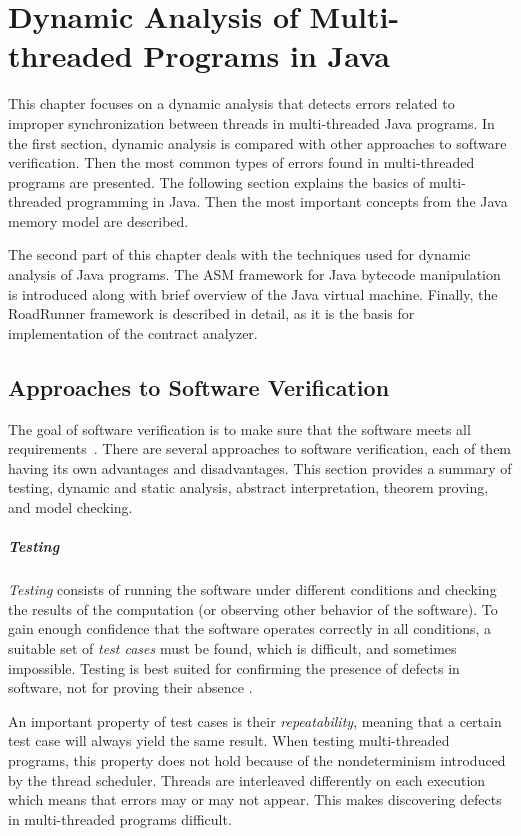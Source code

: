 \chapter{Dynamic Analysis of Multi-threaded Programs in Java}
\label{chTwo}

This chapter focuses on a dynamic analysis that detects errors related to
improper synchronization between threads in multi-threaded Java programs. In the
first section, dynamic analysis is compared with other approaches to software
verification. Then the most common types of errors found in multi-threaded
programs are presented. The following section explains the basics of
multi-threaded programming in Java. Then the most important concepts from the
Java memory model are described.

The second part of this chapter deals with the techniques used for dynamic
analysis of Java programs. The ASM framework for Java bytecode manipulation is
introduced along with brief overview of the Java virtual machine. Finally, the
RoadRunner framework is described in detail, as it is the basis for
implementation of the contract analyzer.


\section{Approaches to Software Verification}
\label{approachesToSwVerification}

The goal of software verification is to make sure that the software meets all
requirements~\cite{fundamentals}. There are several approaches to software
verification, each of them having its own advantages and disadvantages. This
section provides a summary of testing, dynamic and static analysis, abstract
interpretation, theorem proving, and model checking.

\paragraph{Testing}
\emph{Testing} consists of running the software under different conditions and
checking the results of the computation (or observing other behavior of the
software). To gain enough confidence that the software operates correctly in all
conditions, a suitable set of \emph{test cases} must be found, which is
difficult, and sometimes impossible. Testing is best suited for confirming
the presence of defects in software, not for proving their absence
\cite{fundamentals}.

An important property of test cases is their \emph{repeatability}, meaning that
a certain test case will always yield the same result. When testing
multi-threaded programs, this property does not hold because of the
nondeterminism introduced by the thread scheduler. Threads are interleaved
differently on each execution which means that errors may or may not appear.
This makes discovering defects in multi-threaded programs difficult.

